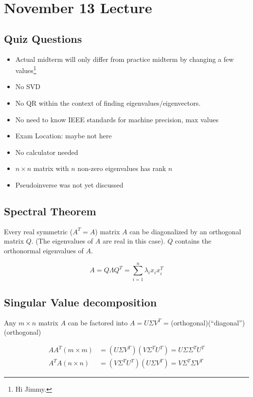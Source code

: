 \section{November 13 Lecture}

\subsection{Quiz Questions}

\begin{itemize}
  \item Actual midterm will only differ from practice midterm by changing a few values\footnote{Hi Jimmy.}
  \item No SVD
  \item No QR within the context of finding eigenvalues/eigenvectors.
  \item No need to know IEEE standards for machine precision, max values
  \item Exam Location: maybe not here
  \item No calculator needed
  \item $n \times n$ matrix with $n$ non-zero eigenvalues has rank $n$
  \item Pseudoinverse was not yet discussed
\end{itemize}

\subsection{Spectral Theorem}
Every real symmetric ($A^T=A$) matrix $A$ can be diagonalized by an orthogonal matrix $Q$. (The eigenvalues of $A$ are real in this case). $Q$ contains the orthonormal eigenvalues of $A$.

\[
  A = Q \Lambda Q^T = \sum_{i=1}^n \lambda_i x_i x_i^T
\]

\subsection{Singular Value decomposition}
Any $m \times n$ matrix $A$ can be factored into $A = U \Sigma V^T$ = (orthogonal)(``diagonal'')(orthogonal)

\begin{align*}
  A A^T (m \times m) &= (U \Sigma V^T) (V \Sigma^T U^T) = U \Sigma \Sigma^T U^T \\
  A^T A (n \times n) &= (V \Sigma^T U^T) (U \Sigma V^T) = V \Sigma^T \Sigma V^T
\end{align*}

